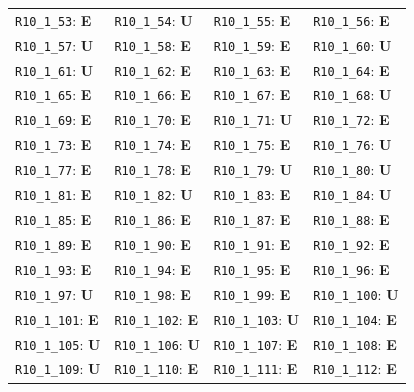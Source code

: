 \begin{longtable}{llll}
\texttt{R10\_1\_53}: \textbf{E} & \texttt{R10\_1\_54}: \textbf{U} & \texttt{R10\_1\_55}: \textbf{E} & \texttt{R10\_1\_56}: \textbf{E} \\
\texttt{R10\_1\_57}: \textbf{U} & \texttt{R10\_1\_58}: \textbf{E} & \texttt{R10\_1\_59}: \textbf{E} & \texttt{R10\_1\_60}: \textbf{U} \\
\texttt{R10\_1\_61}: \textbf{U} & \texttt{R10\_1\_62}: \textbf{E} & \texttt{R10\_1\_63}: \textbf{E} & \texttt{R10\_1\_64}: \textbf{E} \\
\texttt{R10\_1\_65}: \textbf{E} & \texttt{R10\_1\_66}: \textbf{E} & \texttt{R10\_1\_67}: \textbf{E} & \texttt{R10\_1\_68}: \textbf{U} \\
\texttt{R10\_1\_69}: \textbf{E} & \texttt{R10\_1\_70}: \textbf{E} & \texttt{R10\_1\_71}: \textbf{U} & \texttt{R10\_1\_72}: \textbf{E} \\
\texttt{R10\_1\_73}: \textbf{E} & \texttt{R10\_1\_74}: \textbf{E} & \texttt{R10\_1\_75}: \textbf{E} & \texttt{R10\_1\_76}: \textbf{U} \\
\texttt{R10\_1\_77}: \textbf{E} & \texttt{R10\_1\_78}: \textbf{E} & \texttt{R10\_1\_79}: \textbf{U} & \texttt{R10\_1\_80}: \textbf{U} \\
\texttt{R10\_1\_81}: \textbf{E} & \texttt{R10\_1\_82}: \textbf{U} & \texttt{R10\_1\_83}: \textbf{E} & \texttt{R10\_1\_84}: \textbf{U} \\
\texttt{R10\_1\_85}: \textbf{E} & \texttt{R10\_1\_86}: \textbf{E} & \texttt{R10\_1\_87}: \textbf{E} & \texttt{R10\_1\_88}: \textbf{E} \\
\texttt{R10\_1\_89}: \textbf{E} & \texttt{R10\_1\_90}: \textbf{E} & \texttt{R10\_1\_91}: \textbf{E} & \texttt{R10\_1\_92}: \textbf{E} \\
\texttt{R10\_1\_93}: \textbf{E} & \texttt{R10\_1\_94}: \textbf{E} & \texttt{R10\_1\_95}: \textbf{E} & \texttt{R10\_1\_96}: \textbf{E} \\
\texttt{R10\_1\_97}: \textbf{U} & \texttt{R10\_1\_98}: \textbf{E} & \texttt{R10\_1\_99}: \textbf{E} & \texttt{R10\_1\_100}: \textbf{U} \\
\texttt{R10\_1\_101}: \textbf{E} & \texttt{R10\_1\_102}: \textbf{E} & \texttt{R10\_1\_103}: \textbf{U} & \texttt{R10\_1\_104}: \textbf{E} \\
\texttt{R10\_1\_105}: \textbf{U} & \texttt{R10\_1\_106}: \textbf{U} & \texttt{R10\_1\_107}: \textbf{E} & \texttt{R10\_1\_108}: \textbf{E} \\
\texttt{R10\_1\_109}: \textbf{U} & \texttt{R10\_1\_110}: \textbf{E} & \texttt{R10\_1\_111}: \textbf{E} & \texttt{R10\_1\_112}: \textbf{E} \\

\end{longtable}
